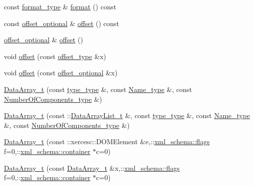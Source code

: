 \begin{DoxyCompactItemize}
\item 
const \hyperlink{classDataArray__t_ae453ea653980baef2e3296005d70bfbd}{format\+\_\+type} \& \hyperlink{classDataArray__t_a7a39cab4205282736e633d8a3c57bbae}{format} () const 
\item 
const \hyperlink{classDataArray__t_a4bc33060e7c386b658c752347ac5f03e}{offset\+\_\+optional} \& \hyperlink{classDataArray__t_a995d24c5c7a88929a6b0e7de154bbdf5}{offset} () const 
\item 
\hyperlink{classDataArray__t_a4bc33060e7c386b658c752347ac5f03e}{offset\+\_\+optional} \& \hyperlink{classDataArray__t_aed72cbf5f3476360f4898f487a074c26}{offset} ()
\item 
void \hyperlink{classDataArray__t_ac133def4ed8ae6c623d0144f036a18d7}{offset} (const \hyperlink{classDataArray__t_a7b840c5f08bd2c65cd3c5e24ad132cfb}{offset\+\_\+type} \&x)
\item 
void \hyperlink{classDataArray__t_a5abb95d7ab6fb95015c06de57a6ccbc9}{offset} (const \hyperlink{classDataArray__t_a4bc33060e7c386b658c752347ac5f03e}{offset\+\_\+optional} \&x)
\item 
\hyperlink{classDataArray__t_a0700e9e63538064c2f9eb668fe3ca624}{Data\+Array\+\_\+t} (const \hyperlink{classDataArray__t_a484a0509e4f141d9970d75881703a51e}{type\+\_\+type} \&, const \hyperlink{classDataArray__t_afc6836923916c2489f91caea78ec4ad6}{Name\+\_\+type} \&, const \hyperlink{classDataArray__t_aac602cec132f6e771f7fa3be1d19c16f}{Number\+Of\+Components\+\_\+type} \&)
\item 
\hyperlink{classDataArray__t_a3c07c46f9c607ce6da2d2e456494465a}{Data\+Array\+\_\+t} (const \+::\hyperlink{classDataArrayList__t}{Data\+Array\+List\+\_\+t} \&, const \hyperlink{classDataArray__t_a484a0509e4f141d9970d75881703a51e}{type\+\_\+type} \&, const \hyperlink{classDataArray__t_afc6836923916c2489f91caea78ec4ad6}{Name\+\_\+type} \&, const \hyperlink{classDataArray__t_aac602cec132f6e771f7fa3be1d19c16f}{Number\+Of\+Components\+\_\+type} \&)
\item 
\hyperlink{classDataArray__t_ae02d07853318c1d754e0acfc80f5c894}{Data\+Array\+\_\+t} (const \+::xercesc\+::\+D\+O\+M\+Element \&e,\+::\hyperlink{namespacexml__schema_a0612287d030cb2732d31a45b258fdc87}{xml\+\_\+schema\+::flags} f=0,\+::\hyperlink{namespacexml__schema_ada9aa30dc722e93ee2ed7243085402a5}{xml\+\_\+schema\+::container} $\ast$c=0)
\item 
\hyperlink{classDataArray__t_a6f67fee4225ca87492d8496de4121de7}{Data\+Array\+\_\+t} (const \hyperlink{classDataArray__t}{Data\+Array\+\_\+t} \&x,\+::\hyperlink{namespacexml__schema_a0612287d030cb2732d31a45b258fdc87}{xml\+\_\+schema\+::flags} f=0,\+::\hyperlink{namespacexml__schema_ada9aa30dc722e93ee2ed7243085402a5}{xml\+\_\+schema\+::container} $\ast$c=0)

\end{DoxyCompactItemize}
